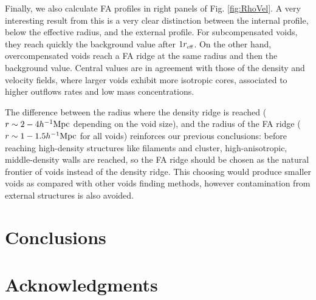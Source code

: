 \documentclass[a4,useAMS,usenatbib,usegraphicx]{mn2e}
\newcommand{\hMpc}{{\ifmmode{h^{-1}{\rm Mpc}}\else{$h^{-1}$Mpc}\fi}}
\newcommand{\reff}{{\ifmmode{r_{\mbox{\tiny eff}}}\else{$r_{\mbox{\tiny eff}}$}\fi}}
\begin{document}
Finally, we also calculate FA profiles in right panels of Fig. \ref{fig:RhoVel}.
A very interesting result from this is a very clear distinction between
the internal profile, below the effective radius, and the external profile. 
For subcompensated voids, they reach quickly the background 
value after $1\reff$. On the other hand, overcompensated voids reach a FA 
ridge at the same radius and then the background value. Central values are
in agreement with those of the density and velocity fields, where larger 
voids exhibit more isotropic cores, associated to higher outflows rates 
and low mass concentrations.


The difference between the radius where the density ridge is reached 
($r\sim 2-4\hMpc$ depending on the void size), and the radius of the FA 
ridge ($r\sim 1-1.5\hMpc$ for all voids) reinforces our previous 
conclusions: before reaching high-density structures like filaments and 
cluster, high-anisotropic, middle-density walls are reached, so the FA 
ridge should be chosen as the natural frontier of voids instead of the
density ridge. This choosing would produce smaller voids as compared with
other voids finding methods, however contamination from external structures
is also avoided.


\section{Conclusions}
\label{sec:conclusions}


\section*{Acknowledgments}  



\end{document}
